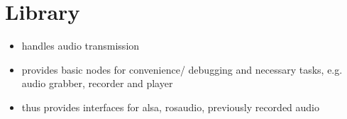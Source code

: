 


\section{Library}

\begin{itemize}
	\item handles audio transmission
	\item provides basic nodes for convenience/ debugging and necessary tasks, e.g. audio grabber, recorder and player
	\item thus provides interfaces for alsa, rosaudio, previously recorded audio
\end{itemize}